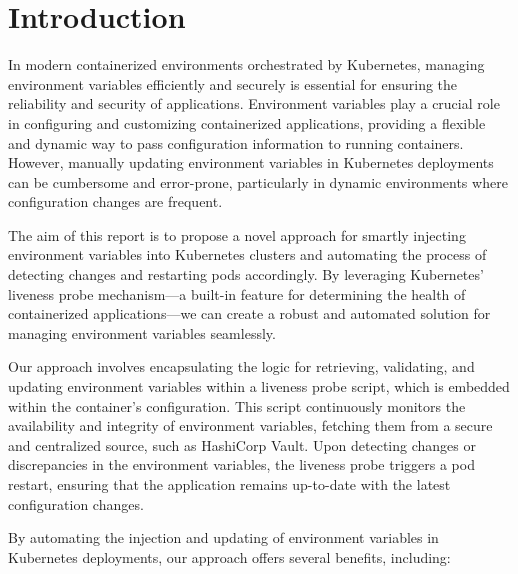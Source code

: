 \section{Introduction}

In modern containerized environments orchestrated by Kubernetes, managing environment variables efficiently and securely is essential for ensuring the reliability and security of applications. Environment variables play a crucial role in configuring and customizing containerized applications, providing a flexible and dynamic way to pass configuration information to running containers. However, manually updating environment variables in Kubernetes deployments can be cumbersome and error-prone, particularly in dynamic environments where configuration changes are frequent.

The aim of this report is to propose a novel approach for smartly injecting environment variables into Kubernetes clusters and automating the process of detecting changes and restarting pods accordingly. By leveraging Kubernetes' liveness probe mechanism—a built-in feature for determining the health of containerized applications—we can create a robust and automated solution for managing environment variables seamlessly.

Our approach involves encapsulating the logic for retrieving, validating, and updating environment variables within a liveness probe script, which is embedded within the container's configuration. This script continuously monitors the availability and integrity of environment variables, fetching them from a secure and centralized source, such as HashiCorp Vault. Upon detecting changes or discrepancies in the environment variables, the liveness probe triggers a pod restart, ensuring that the application remains up-to-date with the latest configuration changes.

By automating the injection and updating of environment variables in Kubernetes deployments, our approach offers several benefits, including:

